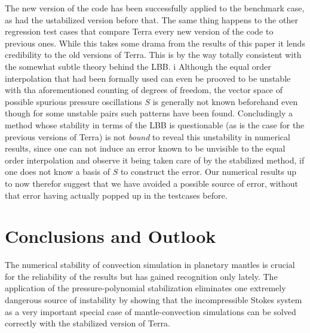 \documentclass[times]{fldauth}
\begin{document}
The new version of the code has been successfully applied to the benchmark case, as had the ustabilized version before that. The same thing happens to the other regression test cases that compare Terra every new version of the code to previous ones.
While this takes some drama from the results of this paper it lends credibility to the old versions of Terra.
This is by the way totally consistent with the somewhat subtle theory behind the LBB. i
Although the equal order interpolation that had been formally used can even be prooved to be unstable with tha aforementioned counting of degrees of freedom, the vector space of possible spurious pressure oscillations $S$ is generally not known beforehand even though for some unstable pairs such patterns have been found. 
Concludingly a method whose stability in terms of the LBB is questionable (as is the case for the previous versions of Terra) is not \emph{bound} to reveal this unstability in numerical results, since one can not induce an error known to be unvisible to the equal order interpolation and observe it being taken care of by the stabilized method, if one does not know a basis of $S$ to construct the error. 
Our numerical results up to now therefor suggest that we have avoided a possible source of error, without that error having actually popped up in the testcases before.  

\section{Conclusions and Outlook}
The numerical stability of convection simulation in planetary mantles is crucial for the reliability of the results but has gained recognition only lately.
The application of the pressure-polynomial stabilization eliminates one extremely dangerous source of instability by showing that the incompressible Stokes system as a very important special case of mantle-convection simulations can be solved correctly with the stabilized version of Terra.
\end{document}
